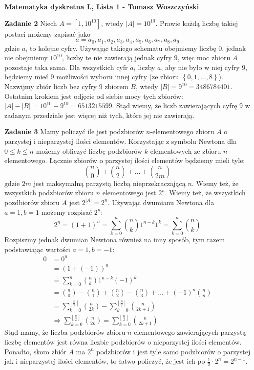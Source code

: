 \documentclass[a4paper,12pt]{article}
\newcommand{\floor}[1]{\left\lfloor #1 \right\rfloor}
\newcommand{\set}[1]{\left \{ #1 \right \}}
\begin{document}
\noindent \textbf{Matematyka dyskretna L, Lista 1 - Tomasz Woszczyński}\newline

\noindent \newline \textbf{Zadanie 2} \newline
Niech $A = \left[ 1, 10^{10} \right]$, wtedy $|A| = 10^{10}$. Prawie każdą liczbę takiej postaci możemy zapisać jako 
$$a = a_0, a_1, a_2, a_3, a_4, a_5, a_6, a_7, a_8, a_9 $$
gdzie $a_i$ to kolejne cyfry. Używając takiego schematu obejmiemy liczbę $0$, jednak nie obejmiemy $10^{10}$, liczby te nie zawierają jednak cyfry $9$, więc moc zbioru $A$ pozostaje taka sama. Dla wszystkich cyfr $a_i$ liczby $a$, aby nie było w niej cyfry $9$, będziemy mieć $9$ możliwości wyboru innej cyfry (ze zbioru $\set{0,1, \ldots, 8}$). Nazwijmy zbiór liczb bez cyfry $9$ zbiorem $B$, wtedy $|B| = 9^{10} = 3486784401$. Ostatnim krokiem jest odjęcie od siebie mocy tych zbiorów: $|A|-|B| = 10^{10} - 9^{10} = 6513215599$. Stąd wiemy, że liczb zawierających cyfrę $9$ w zadanym przedziale jest więcej niż tych, które jej nie zawierają.

\noindent \newline \textbf{Zadanie 3} \newline
Mamy policzyć ile jest podzbiorów $n$-elementowego zbioru $A$ o parzystej i nieparzystej ilości elementów. Korzystając z symbolu Newtona dla $0 \leq k \leq n$ możemy obliczyć liczbę podzbiorów $k$-elementowych ze zbioru $n$-elementowego. Łącznie zbiorów o parzystej ilości elementów będziemy mieli tyle:
$$\binom{n}{0} + \binom{n}{2} + \ldots + \binom{n}{2m}$$
gdzie $2m$ jest maksymalną parzystą liczbą nieprzekraczającą $n$. Wiemy też, że wszystkich podzbiorów zbioru $n$ elementowego jest $2^n$. Wiemy też, że wszystkich pozdbiorów zbioru $A$ jest $2^{|A|}=2^n$. Używając dwumianu Newtona dla $a=1, b=1$ możemy rozpisać $2^n$:
$$2^n = (1+1)^n  = \sum\limits_{k=0}^{n} \binom{n}{k} 1^{n-k}1^{k} = \sum\limits_{k=0}^{n} \binom{n}{k}$$
\noindent Rozpiszmy jednak dwumian Newtona również na inny sposób, tym razem podstawiając wartości $a=1, b=-1$:
$$
\begin{aligned}
0 	&= 0^n \\
  	&= (1 + (-1))^{n}	\\
	&= \sum\limits_{k=0}^{n} \binom{n}{k} 1^{n-k} (-1)^{k}	\\
	&= \binom{n}{0} - \binom{n}{1} + \binom{n}{2} - \binom{n}{3} + \ldots + (-1)^n \binom{n}{n}	\\
	&= \sum\limits_{k=0}^{\floor{\frac{n}{2}}} \binom{n}{2k} - \sum\limits_{k=0}^{\floor{\frac{n}{2}}} \binom{n}{2k+1} \\
	&\Rightarrow \sum\limits_{k=0}^{\floor{\frac{n}{2}}} \binom{n}{2k} = \sum\limits_{k=0}^{\floor{\frac{n}{2}}} \binom{n}{2k+1}
\end{aligned}
$$
Stąd mamy, że liczba podzbiorów zbioru $n$-elementowego zawierających parzystą liczbę elementów jest równa liczbie podzbiorów o nieparzystej ilości elementów. Ponadto, skoro zbiór $A$ ma $2^n$ podzbiorów i jest tyle samo podzbiorów o parzystej jak i nieparzystej ilości elementów, to łatwo policzyć, że jest ich po $\frac{1}{2}\cdot 2^n = 2^{n-1}$.
\end{document}
